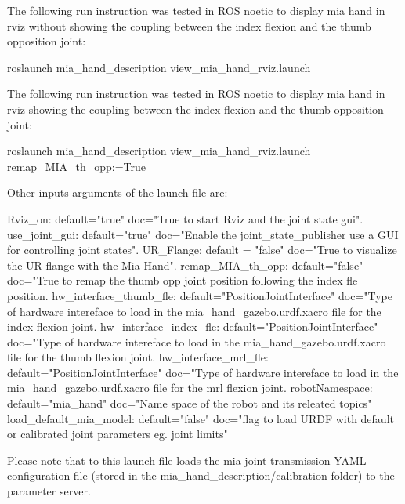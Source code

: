 The following run instruction was tested in R\+OS noetic to display mia hand in rviz without showing the coupling between the index flexion and the thumb opposition joint\+: \begin{DoxyVerb}roslaunch mia_hand_description view_mia_hand_rviz.launch
\end{DoxyVerb}


The following run instruction was tested in R\+OS noetic to display mia hand in rviz showing the coupling between the index flexion and the thumb opposition joint\+: \begin{DoxyVerb}roslaunch mia_hand_description view_mia_hand_rviz.launch remap_MIA_th_opp:=True
\end{DoxyVerb}


Other inputs arguments of the launch file are\+: \begin{DoxyVerb}Rviz_on:                default="true"                   doc="True to start Rviz and the joint state gui".
use_joint_gui:          default="true"                   doc="Enable the joint_state_publisher use a GUI for controlling joint states".
UR_Flange:              default = "false"                doc="True to visualize the UR flange with the Mia Hand".
remap_MIA_th_opp:       default="false"                  doc="True to remap the thumb opp joint position following the index fle position.
hw_interface_thumb_fle: default="PositionJointInterface" doc="Type of hardware intereface to load in the mia_hand_gazebo.urdf.xacro file for the index flexion joint.
hw_interface_index_fle: default="PositionJointInterface" doc="Type of hardware intereface to load in the mia_hand_gazebo.urdf.xacro file for the thumb flexion joint.
hw_interface_mrl_fle:   default="PositionJointInterface" doc="Type of hardware intereface to load in the mia_hand_gazebo.urdf.xacro file for the mrl flexion joint.
robotNamespace:         default="mia_hand"               doc="Name space of the robot and its releated topics"
load_default_mia_model: default="false"                  doc="flag to load URDF with default or calibrated joint parameters eg. joint limits"

Please note that to this launch file loads the mia joint transmission YAML 
configuration file (stored in the mia_hand_description/calibration folder)
to the parameter server.
\end{DoxyVerb}
 